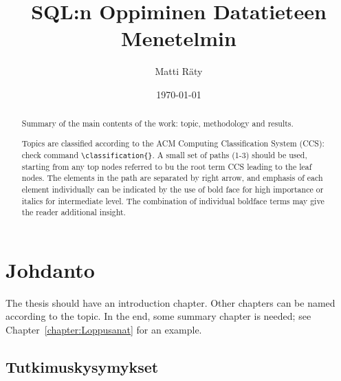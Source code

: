 \documentclass[finnish,twoside,openright]{HYgraduMLDS}
\title{SQL:n Oppiminen Datatieteen Menetelmin}
\author{Matti Räty}
\date{\today}
\begin{document}
\maketitle


\begin{abstract}
Summary of the main contents of the work: topic, methodology and results.

Topics are classified according to the ACM Computing Classification System
(CCS): check command \verb+\classification{}+. A small set of paths (1-3) should be used, starting from any top nodes
referred to bu the root term CCS leading to the leaf nodes. The elements
in the path are separated by right arrow, and emphasis of each element individually can be indicated
by the use of bold face for high importance or italics for intermediate
level. The combination of individual boldface terms may give the reader
additional insight. 
\end{abstract}

\mytableofcontents

\mynomenclature

\chapter{Johdanto}

The thesis should have an introduction chapter. Other chapters can be named according to the topic. In the end, some summary chapter is needed; see Chapter~\ref{chapter:Loppusanat} for an example.

\section{Tutkimuskysymykset}
\end{document}
